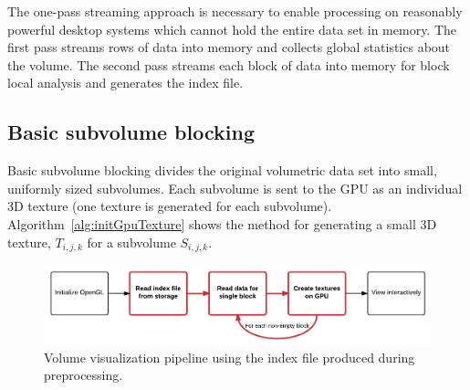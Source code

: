 \documentclass[journal]{vgtc}                %
\begin{document}
The one-pass streaming approach is necessary to enable processing on
reasonably powerful desktop systems which cannot hold the entire data set in
memory. The first pass streams rows of data into memory and collects global
statistics about the volume. The second pass streams each block of data into
memory for block local analysis and generates the index file.






\subsection{Basic subvolume blocking}\label{sec:basicSubvolumeBlocking}

Basic subvolume blocking divides the original volumetric data set into small,
uniformly sized subvolumes. Each subvolume is sent to the GPU
as an individual 3D texture (one texture is generated for each subvolume). 
Algorithm~\ref{alg:initGpuTexture}
shows the method for generating a small 3D texture, $T_{i,j,k}$ for a subvolume
$S_{i,j,k}$.

\begin{figure}[htb]\label{fig:initToViewFlowWithPartition}
	\begin{centering}
		\includegraphics[width=\linewidth,height=0.3\textheight,keepaspectratio]{init-to-view-with-index-file}
		\caption{Volume visualization pipeline using the index file produced during preprocessing.}
	\end{centering}
\end{figure}
\end{document}
